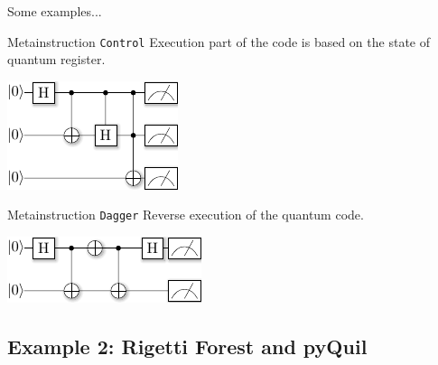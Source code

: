 \documentclass{beamer}
\begin{document}
\begin{frame}{\insertsection}{\insertsubsection}
Some examples...
\end{frame}

\begin{frame}{\insertsection}{\insertsubsection}
    \begin{block}{Metainstruction \texttt{Control}}
        Execution part of the code is based on the state of quantum register.
    \end{block}

    \begin{center}
     \includegraphics[scale=1.5]{pics/meta_control_circ.pdf}
    \end{center}
\end{frame}

\begin{frame}{\insertsection}{\insertsubsection}
    \begin{block}{Metainstruction \texttt{Dagger}}
        Reverse execution of the quantum code.
    \end{block}
    
    \begin{center}
        \includegraphics[scale=1.5]{pics/meta_dagger_circ.pdf}
    \end{center}
\end{frame}





\subsection{Example 2: Rigetti Forest and pyQuil}
\end{document}
